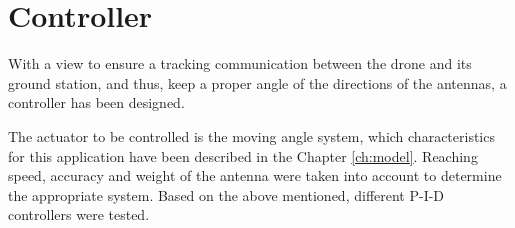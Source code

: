 \chapter{Controller}\label{sec:controller}
With a view to ensure a tracking communication between the drone and its ground station, and thus, keep a proper angle of the directions of the antennas, a controller has been designed.\par

The actuator to be controlled is the moving angle system, which characteristics for this application have been described in the Chapter \ref{ch:model}.  Reaching speed, accuracy and weight of the antenna were taken into account to determine the appropriate system. Based on the above mentioned, different P-I-D controllers were tested.\par 	









